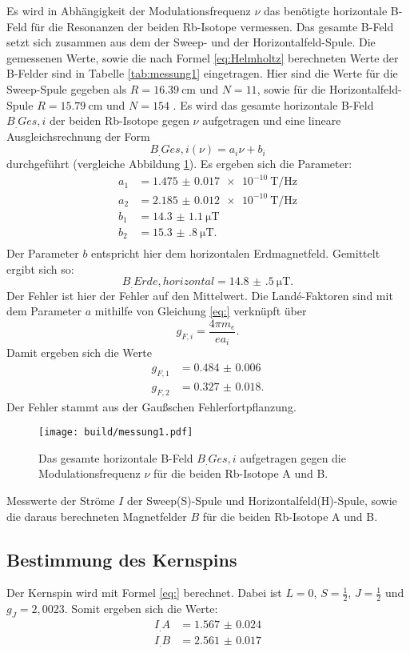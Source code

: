 Es wird in Abhängigkeit der Modulationsfrequenz $\nu$ das benötigte horizontale B-Feld für die Resonanzen der beiden Rb-Isotope vermessen. Das gesamte B-Feld setzt sich zusammen aus dem der Sweep- und der Horizontalfeld-Spule. Die gemessenen Werte, sowie die nach Formel \ref{eq:Helmholtz} berechneten Werte der B-Felder sind in Tabelle \ref{tab:messung1} eingetragen. Hier sind die Werte für die Sweep-Spule gegeben als $R=\SI{16.39}{\centi\metre}$ und $N=11$, sowie für die Horizontalfeld-Spule $R=\SI{15.79}{\centi\metre}$ und $N=154$ \cite{V21}.
Es wird das gesamte horizontale B-Feld $B_.{Ges,i}$ der beiden Rb-Isotope gegen $\nu$ aufgetragen und eine lineare Ausgleichsrechnung der Form
\[
B_.{Ges,i}(\nu) = a_i\nu + b_i
\]
durchgeführt (vergleiche Abbildung \ref{fig:messung1}).
Es ergeben sich die Parameter:
\begin{align*}
a_1 &= \SI{1.475(17)e-10}{\tesla\per\hertz}\\
a_2 &= \SI{2.185(12)e-10}{\tesla\per\hertz}\\
b_1 &= \SI{14.3(11)}{\micro\tesla}\\
b_2 &= \SI{15.3(8)}{\micro\tesla}\text{.}\\
\end{align*}
Der Parameter $b$ entspricht hier dem horizontalen Erdmagnetfeld. Gemittelt ergibt sich so:
\[
B_.{Erde,horizontal} = \SI{14.8(5)}{\micro\tesla}\text{.}
\]
Der Fehler ist hier der Fehler auf den Mittelwert.
Die Landé-Faktoren sind mit dem Parameter $a$ mithilfe von Gleichung \eqref{eq:} verknüpft über
\begin{equation*}
g_{F,i}=\frac{4\pi m_e}{e a_i} \text{.}
\end{equation*}
Damit ergeben sich die Werte
\begin{align*}
g_{F,1} &= \num{0.484(6)}\\
g_{F,2} &= \num{0.327(18)}\text{.}
\end{align*}
Der Fehler stammt aus der Gaußschen Fehlerfortpflanzung.

\begin{figure}
	\centering
	\texttt{[image: build/messung1.pdf]}
	\caption{Das gesamte horizontale B-Feld $B_.{Ges,i}$ aufgetragen gegen die Modulationsfrequenz $\nu$ für die beiden Rb-Isotope A und B.}
	\label{fig:messung1}
\end{figure}

\begin{table}
	\centering
	\caption{Messwerte der Ströme $I$ der Sweep(S)-Spule und Horizontalfeld(H)-Spule, sowie die daraus berechneten Magnetfelder $B$ für die beiden Rb-Isotope A und B.}
	
	
	\label{tab:messung1}
\end{table}

\subsection{Bestimmung des Kernspins}

Der Kernspin wird mit Formel \eqref{eq:} berechnet. Dabei ist $L=0$, $S=\frac{1}{2}$, $J=\frac{1}{2}$ und $g_J=2,0023$. 
Somit ergeben sich die Werte:
\begin{align*}
I_.A &= \num{1.567(24)}\\
I_.B &= \num{2.561(17)}
\end{align*}